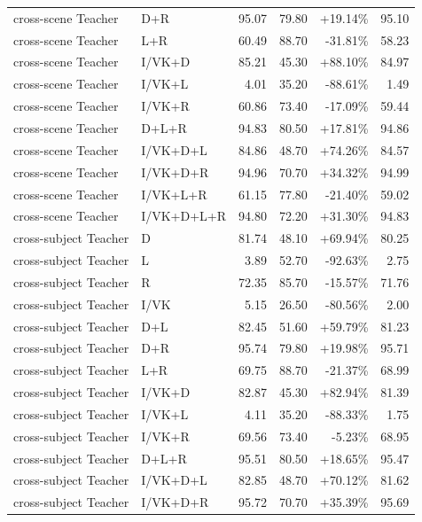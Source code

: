 \documentclass[UTF8,10pt]{ctexart}
\newcommand{\better}[1]{\textcolor{goodblue}{#1}}
\newcommand{\worse}[1]{\textcolor{badred}{#1}}
\begin{document}
{\begin{longtable}{llrrrr}
cross-scene Teacher & D+R & 95.07 & 79.80 & \better{+19.14\%} & 95.10\\
cross-scene Teacher & L+R & 60.49 & 88.70 & \worse{-31.81\%} & 58.23\\
cross-scene Teacher & I/VK+D & 85.21 & 45.30 & \better{+88.10\%} & 84.97\\
cross-scene Teacher & I/VK+L & 4.01 & 35.20 & \worse{-88.61\%} & 1.49\\
cross-scene Teacher & I/VK+R & 60.86 & 73.40 & \worse{-17.09\%} & 59.44\\
cross-scene Teacher & D+L+R & 94.83 & 80.50 & \better{+17.81\%} & 94.86\\
cross-scene Teacher & I/VK+D+L & 84.86 & 48.70 & \better{+74.26\%} & 84.57\\
cross-scene Teacher & I/VK+D+R & 94.96 & 70.70 & \better{+34.32\%} & 94.99\\
cross-scene Teacher & I/VK+L+R & 61.15 & 77.80 & \worse{-21.40\%} & 59.02\\
cross-scene Teacher & I/VK+D+L+R & 94.80 & 72.20 & \better{+31.30\%} & 94.83\\
cross-subject Teacher & D & 81.74 & 48.10 & \better{+69.94\%} & 80.25\\
cross-subject Teacher & L & 3.89 & 52.70 & \worse{-92.63\%} & 2.75\\
cross-subject Teacher & R & 72.35 & 85.70 & \worse{-15.57\%} & 71.76\\
cross-subject Teacher & I/VK & 5.15 & 26.50 & \worse{-80.56\%} & 2.00\\
cross-subject Teacher & D+L & 82.45 & 51.60 & \better{+59.79\%} & 81.23\\
cross-subject Teacher & D+R & 95.74 & 79.80 & \better{+19.98\%} & 95.71\\
cross-subject Teacher & L+R & 69.75 & 88.70 & \worse{-21.37\%} & 68.99\\
cross-subject Teacher & I/VK+D & 82.87 & 45.30 & \better{+82.94\%} & 81.39\\
cross-subject Teacher & I/VK+L & 4.11 & 35.20 & \worse{-88.33\%} & 1.75\\
cross-subject Teacher & I/VK+R & 69.56 & 73.40 & \worse{-5.23\%} & 68.95\\
cross-subject Teacher & D+L+R & 95.51 & 80.50 & \better{+18.65\%} & 95.47\\
cross-subject Teacher & I/VK+D+L & 82.85 & 48.70 & \better{+70.12\%} & 81.62\\
cross-subject Teacher & I/VK+D+R & 95.72 & 70.70 & \better{+35.39\%} & 95.69\\

\end{longtable}}
\end{document}
